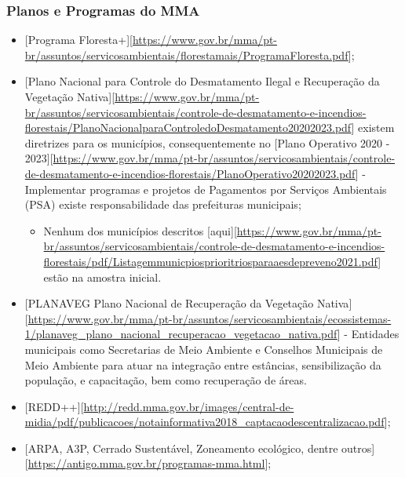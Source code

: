 \documentclass[
]{article}
\providecommand{\tightlist}{%
  \setlength{\itemsep}{0pt}\setlength{\parskip}{0pt}}
\begin{document}
\hypertarget{planos-e-programas-do-mma}{%
\subsubsection{Planos e Programas do
MMA}\label{planos-e-programas-do-mma}}

\begin{itemize}
\tightlist
\item
  {[}Programa
  Floresta+{]}{[}\url{https://www.gov.br/mma/pt-br/assuntos/servicosambientais/florestamais/ProgramaFloresta.pdf}{]};
\item
  {[}Plano Nacional para Controle do Desmatamento Ilegal e Recuperação
  da Vegetação
  Nativa{]}{[}\url{https://www.gov.br/mma/pt-br/assuntos/servicosambientais/controle-de-desmatamento-e-incendios-florestais/PlanoNacionalparaControledoDesmatamento20202023.pdf}{]}
  existem diretrizes para os municípios, consequentemente no {[}Plano
  Operativo 2020 -
  2023{]}{[}\url{https://www.gov.br/mma/pt-br/assuntos/servicosambientais/controle-de-desmatamento-e-incendios-florestais/PlanoOperativo20202023.pdf}{]}
  - Implementar programas e projetos de Pagamentos por Serviços
  Ambientais (PSA) existe responsabilidade das prefeituras municipais;

  \begin{itemize}
  \tightlist
  \item
    Nenhum dos municípios descritos
    {[}aqui{]}{[}\url{https://www.gov.br/mma/pt-br/assuntos/servicosambientais/controle-de-desmatamento-e-incendios-florestais/pdf/Listagemmunicpiosprioritriosparaaesdepreveno2021.pdf}{]}
    estão na amostra inicial.
  \end{itemize}
\item
  {[}PLANAVEG Plano Nacional de Recuperação da Vegetação
  Nativa{]}{[}\url{https://www.gov.br/mma/pt-br/assuntos/servicosambientais/ecossistemas-1/planaveg_plano_nacional_recuperacao_vegetacao_nativa.pdf}{]}
  - Entidades municipais como Secretarias de Meio Ambiente e Conselhos
  Municipais de Meio Ambiente para atuar na integração entre estâncias,
  sensibilização da população, e capacitação, bem como recuperação de
  áreas.
\item
  {[}REDD++{]}{[}\url{http://redd.mma.gov.br/images/central-de-midia/pdf/publicacoes/notainformativa2018_captacaodescentralizacao.pdf}{]};
\item
  {[}ARPA, A3P, Cerrado Sustentável, Zoneamento ecológico, dentre
  outros{]}{[}\url{https://antigo.mma.gov.br/programas-mma.html}{]};
\end{itemize}
\end{document}
